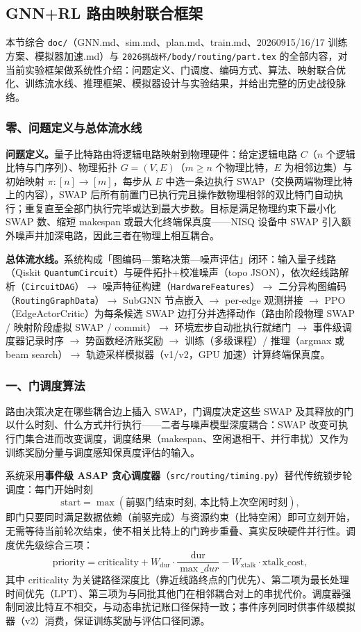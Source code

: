 \subsection{GNN+RL 路由映射联合框架}

本节综合 \texttt{doc/}（GNN.md、sim.md、plan.md、train.md、20260915/16/17 训练方案、模拟器加速.md）与 \texttt{2026挑战杯/body/routing/part.tex} 的全部内容，对当前实验框架做系统性介绍：问题定义、门调度、编码方式、算法、映射联合优化、训练流水线、推理框架、模拟器设计与实验结果，并给出完整的历史战役脉络。

\subsubsection{零、问题定义与总体流水线}

\textbf{问题定义。}量子比特路由将逻辑电路映射到物理硬件：给定逻辑电路 $C$（$n$ 个逻辑比特与门序列）、物理拓扑 $G=(V,E)$（$m\ge n$ 个物理比特，$E$ 为相邻边集）与初始映射 $\pi:[n]\to[m]$，每步从 $E$ 中选一条边执行 SWAP（交换两端物理比特上的内容），SWAP 后所有前置门已执行完且操作数物理相邻的双比特门自动执行；重复直至全部门执行完毕或达到最大步数。目标是满足物理约束下最小化 SWAP 数、缩短 makespan 或最大化终端保真度——NISQ 设备中 SWAP 引入额外噪声并加深电路，因此三者在物理上相互耦合。

\textbf{总体流水线。}系统构成「图编码—策略决策—噪声评估」闭环：输入量子线路（Qiskit \texttt{QuantumCircuit}）与硬件拓扑+校准噪声（topo JSON），依次经线路解析（\texttt{CircuitDAG}）$\to$ 噪声特征构建（\texttt{HardwareFeatures}）$\to$ 二分异构图编码（\texttt{RoutingGraphData}）$\to$ SubGNN 节点嵌入 $\to$ per-edge 观测拼接 $\to$ PPO（EdgeActorCritic）为每条候选 SWAP 边打分并选择动作（路由阶段物理 SWAP / 映射阶段虚拟 SWAP / commit）$\to$ 环境宏步自动批执行就绪门 $\to$ 事件级调度器记录时序 $\to$ 势函数经济账奖励 $\to$ 训练（多级课程）/ 推理（argmax 或 beam search）$\to$ 轨迹采样模拟器（v1/v2，GPU 加速）计算终端保真度。

\subsubsection{一、门调度算法}

路由决策决定在哪些耦合边上插入 SWAP，门调度决定这些 SWAP 及其释放的门以什么时刻、什么方式并行执行——二者与噪声模型深度耦合：SWAP 改变可执行门集合进而改变调度，调度结果（makespan、空闲退相干、并行串扰）又作为训练奖励分量与调度感知保真度评估的输入。

系统采用\textbf{事件级 ASAP 贪心调度器}（\texttt{src/routing/timing.py}）替代传统锁步轮调度：每门开始时刻
\[
\mathrm{start}=\max(\text{前驱门结束时刻},\ \text{本比特上次空闲时刻}),
\]
即门只要同时满足数据依赖（前驱完成）与资源约束（比特空闲）即可立刻开始，无需等待当前轮次结束，使不相关比特上的门跨步重叠、真实反映硬件并行性。调度优先级综合三项：
\[
\mathrm{priority}=\mathrm{criticality}+W_{\mathrm{dur}}\cdot\frac{\mathrm{dur}}{\max\_dur}-W_{\mathrm{xtalk}}\cdot\mathrm{xtalk\_cost},
\]
其中 criticality 为关键路径深度比（靠近线路终点的门优先）、第二项为最长处理时间优先（LPT）、第三项为与同批其他门在相邻耦合对上的串扰代价。调度器强制同波比特互不相交，与动态串扰记账口径保持一致；事件序列同时供事件级模拟器（v2）消费，保证训练奖励与评估口径同源。


